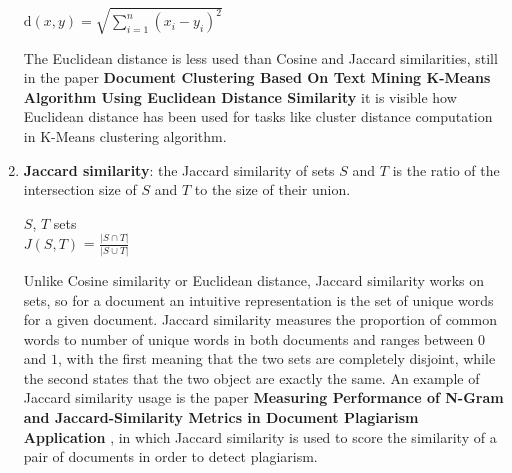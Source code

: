 \documentclass[\main/main.tex]{subfiles}
\begin{document}
\begin{enumerate}
    \begin{center}
        $\mathrm{d}(x, y) = \sqrt{\sum\limits_{i=1}^n (x_i-y_i)^2}$
    \end{center}
    The Euclidean distance is less used than Cosine and Jaccard similarities, still in the paper \textbf{Document Clustering Based On Text Mining K-Means Algorithm Using Euclidean Distance Similarity} \cite{Lydia2018DocumentCB} it is visible how Euclidean distance has been used for tasks like cluster distance computation in K-Means clustering algorithm.
    \item \textbf{Jaccard similarity}: the Jaccard similarity \cite{leskovec_rajaraman_ullman_2020}\cite{Gomaa2013ASO} of sets $S$ and $T$ is  the ratio of the intersection size of $S$ and $T$ to the size of their union.\\
    \begin{center}
        $S$, $T$ sets\\
        $J(S, T)$ = $\frac{| S \cap T|}{|S \cup T|}$
    \end{center}
    Unlike Cosine similarity or Euclidean distance, Jaccard similarity works on sets, so for a document an intuitive representation is the set of unique words for a given document. Jaccard similarity measures the proportion of common words to number of unique words in both documents and ranges between $0$ and $1$, with the first meaning that the two sets are completely disjoint, while the second states that the two object are exactly the same. An example of Jaccard similarity usage is the paper \textbf{Measuring Performance of N-Gram and Jaccard-Similarity Metrics in Document Plagiarism Application} \cite{Eka_Diana_2019}, in which Jaccard similarity is used to score the similarity of a pair of documents in order to detect plagiarism.
\end{enumerate}
\end{document}
